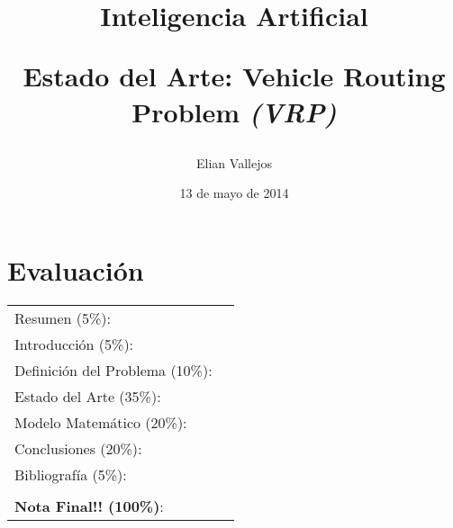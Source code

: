 \documentclass[letter, 10pt]{article}
\begin{document}
\title{Inteligencia Artificial \\ \begin{Large}Estado del Arte: Vehicle Routing Problem \emph{(VRP)}\end{Large}}
\author{Elian Vallejos}
\date{13 de mayo de 2014}
\maketitle


\section*{Evaluaci\'on}

\begin{tabular}{ll}
Resumen (5\%): & \underline{\hspace{2cm}} \\
Introducci\'on (5\%):  & \underline{\hspace{2cm}} \\
Definici\'on del Problema (10\%):  & \underline{\hspace{2cm}} \\
Estado del Arte (35\%):  & \underline{\hspace{2cm}} \\
Modelo Matem\'atico (20\%): &  \underline{\hspace{2cm}}\\
Conclusiones (20\%): &  \underline{\hspace{2cm}}\\
Bibliograf\'ia (5\%): & \underline{\hspace{2cm}}\\
 &  \\
\textbf{Nota Final!! (100\%)}:   & \underline{\hspace{2cm}}
\end{tabular}
\vspace{2cm}
\end{document}
